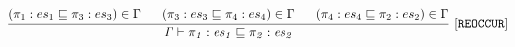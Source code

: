  \begin{gather*}
\frac{
\begin{matrix}
\text{\codeme{ (\pi_1 : \es_1 \CONTAIN \pi_3 : \es_3) \in \Gamma  }} 
\quad\ \ 
\text{\codeme{(\pi_3 : \es_3 \CONTAIN  \pi_4 : \es_4) \in {\Gamma} }} \quad\  \ 
\text{\codeme{ (\pi_4 : \es_4 \CONTAIN \pi_2 : \es_2) \in {\Gamma}  }}
\end{matrix}
}{\text{\code{\Gamma  \vdash  \pi_1 : \es_1 \CONTAIN  \pi_2 : \es_2 }} }
\ \codeme{[REOCCUR]}
\end{gather*}